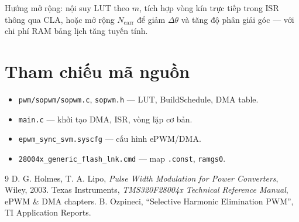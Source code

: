 \documentclass[12pt,a4paper]{article}
\begin{document}
Hướng mở rộng: nội suy LUT theo $m$, tích hợp vòng kín trực tiếp trong ISR thông qua CLA, hoặc mở rộng $N_{\mathrm{carr}}$ để giảm $\Delta\theta$ và tăng độ phân giải góc --- với chi phí RAM bảng lịch tăng tuyến tính.

\appendix
\section{Tham chiếu mã nguồn}

\begin{itemize}
  \item \texttt{pwm/sopwm/sopwm.c}, \texttt{sopwm.h} --- LUT, BuildSchedule, DMA table.
  \item \texttt{main.c} --- khởi tạo DMA, ISR, vòng lặp cơ bản.
  \item \texttt{epwm\_sync\_svm.syscfg} --- cấu hình ePWM/DMA.
  \item \texttt{28004x\_generic\_flash\_lnk.cmd} --- map \texttt{.const}, \texttt{ramgs0}.
\end{itemize}

\begin{thebibliography}{9}
 D. G. Holmes, T. A. Lipo, \emph{Pulse Width Modulation for Power Converters}, Wiley, 2003.
 Texas Instruments, \emph{TMS320F28004x Technical Reference Manual}, ePWM \& DMA chapters.
 B. Ozpineci, ``Selective Harmonic Elimination PWM'', TI Application Reports.
\end{thebibliography}
\end{document}
